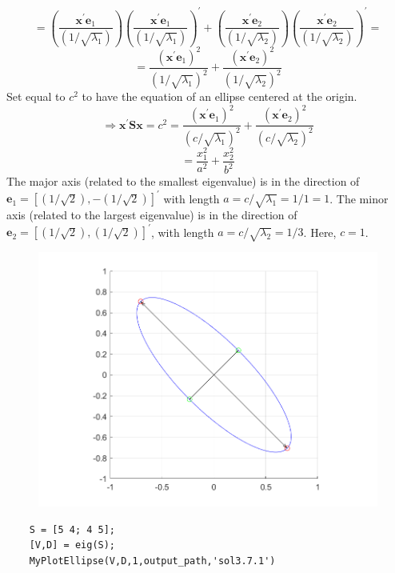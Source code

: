 \[
    =
    \left(\frac{\textbf{x}^{\prime}\textbf{e}_1}{(1/\sqrt{\lambda_1})}\right)
    {\left(\frac{\textbf{x}^{\prime}\textbf{e}_1}{(1/\sqrt{\lambda_1})}\right)}^{\prime}
    +
    \left(\frac{\textbf{x}^{\prime}\textbf{e}_2}{(1/\sqrt{\lambda_2})}\right)
    {\left(\frac{\textbf{x}^{\prime}\textbf{e}_2}{(1/\sqrt{\lambda_2})}\right)}^{\prime}
    =
\]
\[
    =
    \frac{{(\textbf{x}^{\prime}\textbf{e}_1)}^{2}}{{(1/\sqrt{\lambda_1})}^{2}}
    +
    \frac{{(\textbf{x}^{\prime}\textbf{e}_2)}^{2}}{{(1/\sqrt{\lambda_2})}^{2}}
\]
Set equal to $c^2$ to have the equation of an ellipse centered at the origin.
\[
    \Rightarrow
    \textbf{x}^{\prime}
    \textbf{S}
    \textbf{x}
    =
    c^2
    =
    \frac{{(\textbf{x}^{\prime}\textbf{e}_1)}^{2}}{{(c/\sqrt{\lambda_1})}^{2}}
    +
    \frac{{(\textbf{x}^{\prime}\textbf{e}_2)}^{2}}{{(c/\sqrt{\lambda_2})}^{2}}
\]
\[
    =
    \frac{{x}_{1}^{2}}{{a}^{2}}
    +
    \frac{{x}_{2}^{2}}{{b}^{2}}
\]
The major axis (related to the smallest eigenvalue) is in the direction of $\textbf{e}_1 = {[(1/\sqrt{2}), -(1/\sqrt{2})]}^{\prime}$ with length $a = c/\sqrt{\lambda_1} = 1/1 = 1$.
The minor axis (related to the largest eigenvalue) is in the direction of $\textbf{e}_2 = {[(1/\sqrt{2}), (1/\sqrt{2})]}^{\prime}$, with length $a = c/\sqrt{\lambda_2} = 1/3$. Here, $c = 1$.
\begin{figure}[H]
    \centering
    \includegraphics[scale=0.75]{./matlab/chapter-3/sol3.7.1.png}
\end{figure}
\begin{lstlisting}
    S = [5 4; 4 5];
    [V,D] = eig(S);
    MyPlotEllipse(V,D,1,output_path,'sol3.7.1') 
\end{lstlisting}
